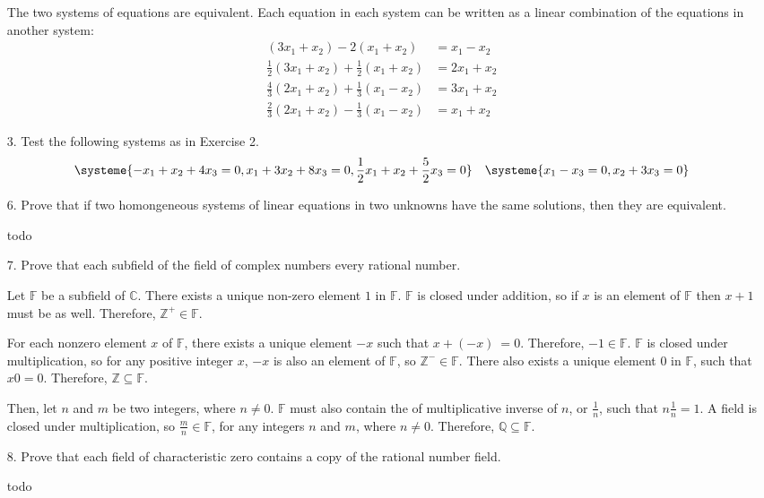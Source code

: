 \documentclass{article}
\begin{document}
\begin{enumerate}[listparindent=\parindent]
    The two systems of equations are equivalent.
    Each equation in each system can be written as a linear combination of the equations in another system:
    \[
        \begin{alignedat}{2}
                        (3x_1+x_2) -           2 (x_1+x_2) &=  x_1-x_2 \\
            \frac{1}{2} (3x_1+x_2) + \frac{1}{2} (x_1+x_2) &= 2x_1+x_2 \\
            \frac{4}{3} (2x_1+x_2) + \frac{1}{3} (x_1-x_2) &= 3x_1+x_2 \\
            \frac{2}{3} (2x_1+x_2) - \frac{1}{3} (x_1-x_2) &=  x_1+x_2
        \end{alignedat}
    \]

\item[3.] Test the following systems as in Exercise 2.
    \[
        \systeme{
            -x_1 + x_2 + 4x_3 = 0,
            x_1 + 3x_2 + 8x_3 = 0,
            \frac{1}{2}x_1 + x_2 + \frac{5}{2}x_3 = 0
        }
        \quad
        \systeme{
            x_1 - x_3 = 0,
            x_2 + 3x_3 = 0
        }
    \]

\item[6.] Prove that if two homongeneous systems of linear equations in two unknowns have the same solutions,
    then they are equivalent.

todo

\item[7.] Prove that each subfield of the field of complex numbers every rational number.

Let \(\mathbb F\) be a subfield of \(\mathbb C\).
There exists a unique non-zero element \(1\) in \(\mathbb F\).
\(\mathbb F\) is closed under addition, so if \(x\) is an element of \(\mathbb F\) then \(x + 1\) must be as well.
Therefore, \(\mathbb Z^+ \in \mathbb F\).

For each nonzero element \(x\) of \(\mathbb F\), there exists a unique element \(-x\) such that \(x + (-x)\ = 0\).
Therefore, \(-1 \in \mathbb F\).
\(\mathbb F\) is closed under multiplication, so for any positive integer \(x\), \(-x\) is also an element of \(\mathbb F\), 
so \(\mathbb Z^- \in \mathbb F\).
There also exists a unique element \(0\) in \(\mathbb F\), such that \(x0 = 0\).
Therefore, \(\mathbb Z \subseteq \mathbb F\).

Then, let \(n\) and \(m\) be two integers, where \(n \neq 0\).
\(\mathbb F\) must also contain the of multiplicative inverse of \(n\), or \(\frac{1}{n}\), such that \(n\frac{1}{n} = 1\).
A field is closed under multiplication, so \(\frac{m}{n} \in \mathbb F\),
for any integers \(n\) and \(m\), where \(n \neq 0\).
Therefore, \(\mathbb Q \subseteq \mathbb F\).

\item[8.]
    Prove that each field of characteristic zero contains a copy of the rational number field.

todo

\end{enumerate}
\end{document}

